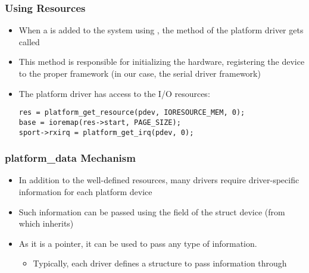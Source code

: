 \begin{frame}[fragile]
  \frametitle{Using Resources}
  \begin{itemize}
  \item When a  is added to the system using
    , the  method of the
    platform driver gets called
  \item This method is responsible for initializing the hardware,
    registering the device to the proper framework (in our case, the
    serial driver framework)
  \item The platform driver has access to the I/O resources:
  \begin{verbatim}
res = platform_get_resource(pdev, IORESOURCE_MEM, 0);
base = ioremap(res->start, PAGE_SIZE);
sport->rxirq = platform_get_irq(pdev, 0);
  \end{verbatim}
  \end{itemize}
\end{frame}

\begin{frame}
  \frametitle{platform\_data Mechanism}
  \begin{itemize}
  \item In addition to the well-defined resources, many drivers
    require driver-specific information for each platform device
  \item Such information can be passed using the 
    field of the struct device (from which
     inherits)
  \item As it is a  pointer, it can be used to pass any
    type of information.
    \begin{itemize}
    \item Typically, each driver defines a structure to pass
      information through 
    \end{itemize}
  \end{itemize}
\end{frame}

